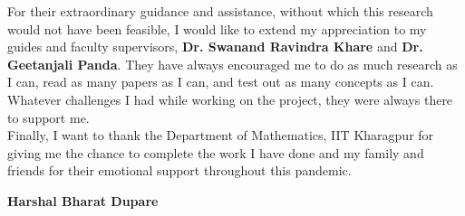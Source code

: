 % 
\begin{acknowledgements}

For their extraordinary guidance and assistance, without which this research would not have been feasible, I would like to extend my appreciation to my guides and faculty supervisors, \textbf{Dr. Swanand Ravindra Khare} and  \textbf{Dr. Geetanjali Panda}. They have always encouraged me to do as much research as I can, read as many papers as I can, and test out as many concepts as I can. Whatever challenges I had while working on the project, they were always there to support me.\\

Finally, I want to thank the Department of Mathematics, IIT Kharagpur for giving me the chance to complete the work I have done and my family and friends for their emotional support throughout this pandemic.
\\[1cm]
\begin{flushright}
\textbf{Harshal Bharat Dupare}
\end{flushright}

\end{acknowledgements}